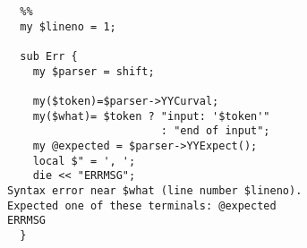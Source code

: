 \begin{verbatim}
  %%
  my $lineno = 1;

  sub Err {
    my $parser = shift;

    my($token)=$parser->YYCurval;
    my($what)= $token ? "input: '$token'" 
                        : "end of input";
    my @expected = $parser->YYExpect();
    local $" = ', ';
    die << "ERRMSG";
Syntax error near $what (line number $lineno).
Expected one of these terminals: @expected
ERRMSG
  }
\end{verbatim}

